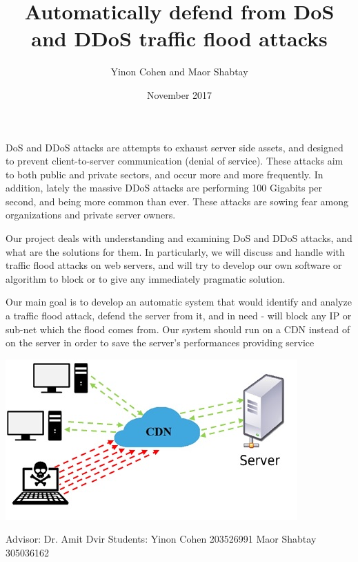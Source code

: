 \documentclass{article}
\title{Automatically defend from DoS and DDoS traffic flood attacks}
\author{Yinon Cohen and Maor Shabtay }
\date{November 2017}
\begin{document}
\maketitle

\hfill \break DoS and DDoS attacks are attempts to exhaust server side assets, and designed to prevent client-to-server communication (denial of service). These attacks aim to both public and private sectors, and occur more and more frequently. In addition, lately the massive DDoS attacks are performing 100 Gigabits per second, and being more common than ever. These attacks are sowing fear among organizations and private server owners.

\hfill \break Our project deals with understanding and examining DoS and DDoS attacks, and what are the solutions for them. In particularly, we will discuss and handle with traffic flood attacks on web servers, and will try to develop our own software or algorithm to block or to give any immediately pragmatic solution.

\hfill \break Our main goal is to develop an automatic system that would identify and analyze a traffic flood attack, defend the server from it, and in need - will block any IP or sub-net which the flood comes from. Our system should run on a CDN instead of on the server in order to save the server’s performances providing service
\hfill \break \hfill \break
    \begin{center}
        \includegraphics{pi}
    \end{center}
 \hfill \break Advisor: Dr. Amit Dvir
 \hfill \break Students: 
 \hfill \break Yinon Cohen 203526991
 \hfill \break Maor Shabtay 305036162
\end{document}
